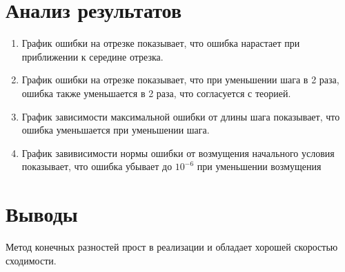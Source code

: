 \documentclass{article}
\begin{document}
	\section{Анализ результатов}
	\begin{enumerate}
		\item График ошибки на отрезке показывает, что ошибка нарастает при приближении к середине отрезка. 
		\item  График ошибки на отрезке показывает, что при уменьшении шага в 2 раза, ошибка также уменьшается в 2 раза, что
		согласуется с теорией.
		\item График зависимости максимальной ошибки от длины шага показывает, что ошибка уменьшается при уменьшении
		шага.
		\item График завивисимости нормы ошибки от возмущения начального условия показывает, что ошибка убывает до $10^{-6}$
		при уменьшении возмущения

	\end{enumerate}
	
	\section{Выводы}
		Метод конечных разностей прост в реализации и обладает хорошей скоростью сходимости.
	
\end{document}
